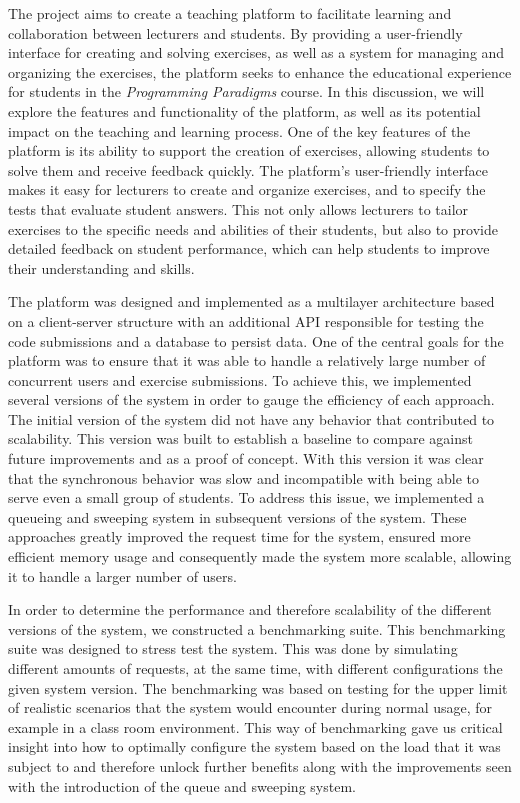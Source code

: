 The project aims to create a teaching platform to facilitate learning and collaboration between lecturers and students. 
By providing a user-friendly interface for creating and solving exercises, as well as a system for managing and organizing the exercises, the platform seeks to enhance the educational experience for students in the \textit{Programming Paradigms} course. 
In this discussion, we will explore the features and functionality of the platform, as well as its potential impact on the teaching and learning process.
One of the key features of the platform is its ability to support the creation of exercises, allowing students to solve them and receive feedback quickly.
The platform's user-friendly interface makes it easy for lecturers to create and organize exercises, and to specify the tests that evaluate student answers. This not only allows lecturers to tailor exercises to the specific needs and abilities of their students, but also to provide detailed feedback on student performance, which can help students to improve their understanding and skills.

The platform was designed and implemented as a multilayer architecture based on a client-server structure with an additional API responsible for testing the code submissions and a database to persist data. One of the central goals for the platform was to ensure that it was able to handle a relatively large number of concurrent users and exercise submissions. To achieve this, we implemented several versions of the system in order to gauge the efficiency of each approach. The initial version of the system did not have any behavior that contributed to scalability. This version was built to establish a baseline to compare against future improvements and as a proof of concept. With this version it was clear that the synchronous behavior was slow and incompatible with being able to serve even a small group of students. To address this issue, we implemented a queueing and sweeping system in subsequent versions of the system. These approaches greatly improved the request time for the system, ensured more efficient memory usage and consequently made the system more scalable, allowing it to handle a larger number of users. 

In order to determine the performance and therefore scalability of the different versions of the system, we constructed a benchmarking suite. 
This benchmarking suite was designed to stress test the system. 
This was done by simulating different amounts of requests, at the same time, with different configurations the given system version. The benchmarking was based on testing for the upper limit of realistic scenarios that the system would encounter during normal usage, for example in a class room environment. This way of benchmarking gave us critical insight into how to optimally configure the system based on the load that it was subject to and therefore unlock further benefits along with the improvements seen with the introduction of the queue and sweeping system.  

